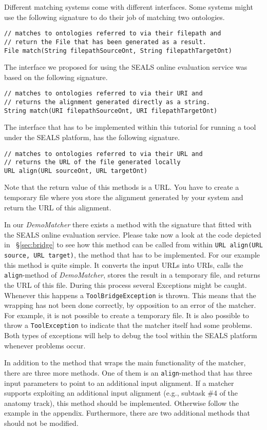 \documentclass{article}
\def\tool#1{\textsl{#1}}
\begin{document}
Different matching systems come with different interfaces. Some systems might use the following signature to do their job of matching two ontologies.
\begin{verbatim}
// matches to ontologies referred to via their filepath and
// return the File that has been generated as a result.
File match(String filepathSourceOnt, String filepathTargetOnt)
\end{verbatim}
The interface we proposed for using the SEALS online evaluation service was based on the following signature.
\begin{verbatim}
// matches to ontologies referred to via their URI and
// returns the alignment generated directly as a string.
String match(URI filepathSourceOnt, URI filepathTargetOnt)
\end{verbatim} 
The interface that has to be implemented within this tutorial for running a tool under the SEALS platform, has the following signature.
\begin{verbatim}
// matches to ontologies referred to via their URL and
// returns the URL of the file generated locally
URL align(URL sourceOnt, URL targetOnt)
\end{verbatim} 
Note that the return value of this methods is a URL. You have to create a temporary file where you store the alignment generated by your system and return the URL of this alignment.

In our \tool{DemoMatcher} there exists a method with the signature that fitted with the SEALS online evaluation service. Please take now a look at the code depicted in ~\S\ref{sec:bridge} to see how this method can be called from within \verb|URL align(URL source, URL target)|, the method that has to be implemented. For our example this method is quite simple. It converts the input URLs into URIs, calls the \verb|align|-method of \tool{DemoMatcher}, stores the result in a temporary file, and returns the URL of this file. During this process several Exceptions might be caught. Whenever this happens a \verb|ToolBridgeException| is thrown. This means that the wrapping has not been done correctly, by opposition to an error of the matcher. For example, it is not possible to create a temporary file. It is also possible to throw a \verb|ToolException| to indicate that the matcher itself had some problems. Both types of exceptions will help to debug the tool within the SEALS platform whenever problems occur. 

In addition to the method that wraps the main functionality of the matcher, there are three more methods. One of them is an \verb|align|-method that has three input parameters to point to an additional input alignment. If a matcher supports exploiting an additional input alignment (e.g., subtask \#4 of the anatomy track), this method should be implemented. Otherwise follow the example in the appendix. Furthermore, there are two additional methods that should not be modified.
\end{document}
